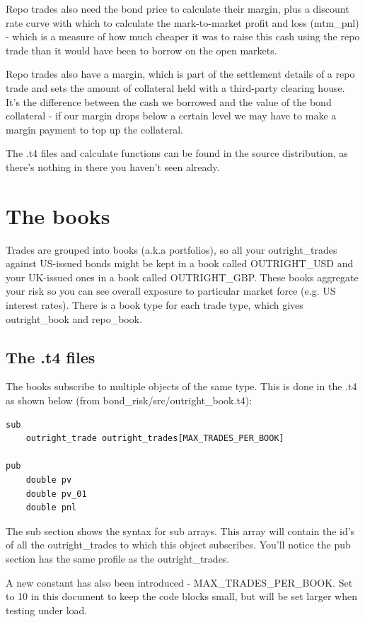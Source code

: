 \documentclass{report}
\begin{document}
Repo trades also need the bond price to calculate their margin, plus a discount rate curve with which to 
calculate the mark-to-market profit and loss (mtm_pnl) - which is a measure of how much cheaper it was to raise this cash using the repo trade than it would have been to borrow on the open markets.

Repo trades also have a margin, which is part of the settlement details of a repo trade and sets the amount of collateral held with a third-party clearing house. It's the difference between the cash we borrowed and the value of the bond collateral - if our margin drops below a certain level we may have to make a margin payment to top up the collateral.

The .t4 files and calculate functions can be found in the source distribution, as there's nothing in there you haven't seen already. 

\section{The books}

Trades are grouped into books (a.k.a portfolios), so all your outright_trades against US-issued bonds might be kept in a book called OUTRIGHT_USD and your UK-issued ones in a book called OUTRIGHT_GBP. These books aggregate your risk so you can see overall exposure to particular market force (e.g. US interest rates). There is a book type for each trade type, which gives outright_book and repo_book.


\subsection{The .t4 files}

The books subscribe to multiple objects of the same type. This is done in the .t4 as shown below (from bond_risk/src/outright_book.t4):

\begin{verbatim}
sub
    outright_trade outright_trades[MAX_TRADES_PER_BOOK]

pub
    double pv
    double pv_01
    double pnl
\end{verbatim}

The sub section shows the syntax for sub arrays. This array will contain the id's of all the outright_trades to which this object subscribes. You'll notice the pub section has the same profile as the outright_trades.

A new constant has also been introduced - MAX_TRADES_PER_BOOK. Set to 10 in this document to keep the code blocks small, but will be set larger when testing under load.
\end{document}
